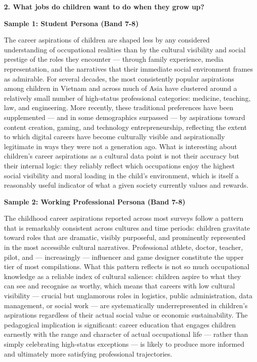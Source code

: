 \separator

\begin{ieltsquestion}
\textbf{2. What jobs do children want to do when they grow up?}
\end{ieltsquestion}
\textbf{Sample 1: Student Persona (Band 7-8)}

The career aspirations of children are shaped less by any considered understanding of occupational realities than by the cultural visibility and social prestige of the roles they encounter — through family experience, media representation, and the narratives that their immediate social environment frames as admirable. For several decades, the most consistently popular aspirations among children in Vietnam and across much of Asia have clustered around a relatively small number of high-status professional categories: medicine, teaching, law, and engineering. More recently, these traditional preferences have been supplemented — and in some demographics surpassed — by aspirations toward content creation, gaming, and technology entrepreneurship, reflecting the extent to which digital careers have become culturally visible and aspirationally legitimate in ways they were not a generation ago. What is interesting about children's career aspirations as a cultural data point is not their accuracy but their internal logic: they reliably reflect which occupations enjoy the highest social visibility and moral loading in the child's environment, which is itself a reasonably useful indicator of what a given society currently values and rewards.

\textbf{Sample 2: Working Professional Persona (Band 7-8)}

The childhood career aspirations reported across most surveys follow a pattern that is remarkably consistent across cultures and time periods: children gravitate toward roles that are dramatic, visibly purposeful, and prominently represented in the most accessible cultural narratives. Professional athlete, doctor, teacher, pilot, and — increasingly — influencer and game designer constitute the upper tier of most compilations. What this pattern reflects is not so much occupational knowledge as a reliable index of cultural salience: children aspire to what they can see and recognise as worthy, which means that careers with low cultural visibility — crucial but unglamorous roles in logistics, public administration, data management, or social work — are systematically underrepresented in children's aspirations regardless of their actual social value or economic sustainability. The pedagogical implication is significant: career education that engages children earnestly with the range and character of actual occupational life — rather than simply celebrating high-status exceptions — is likely to produce more informed and ultimately more satisfying professional trajectories.

